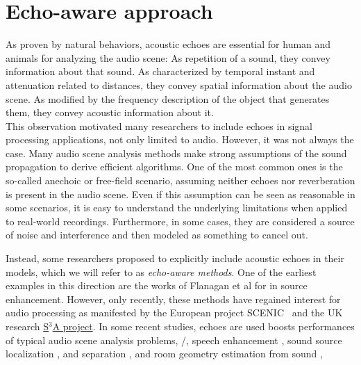 \section{Echo-aware approach}
As proven by natural behaviors, acoustic echoes are essential for human and animals for analyzing the audio scene:
As repetition of a sound, they convey information about that sound.
As characterized by temporal instant and attenuation related to distances, they convey spatial information about the audio scene.
As modified by the frequency description of the object that generates them, they convey acoustic information about it.
\\This observation motivated many researchers to include echoes in signal processing applications, not only limited to audio.
However, it was not always the case.
Many audio scene analysis methods make strong assumptions of the sound propagation to derive efficient algorithms.
One of the most common ones is the so-called anechoic or free-field scenario, assuming neither echoes nor reverberation is present in the audio scene.
Even if this assumption can be seen as reasonable in some scenarios, it is easy to understand the underlying limitations when applied to real-world recordings.
Furthermore, in some cases, they are considered a source of noise and interference and then modeled as something to cancel out.

\mynewline
Instead, some researchers proposed to explicitly include acoustic echoes in their models, which we will refer to as \textit{echo-aware methods}.
One of the earliest examples in this direction are the works of Flanagan et al for in source enhancement.
However, only recently, these methods have regained interest for audio processing as manifested by the European project SCENIC~ and the UK research \href{http://www.s3a-spatialaudio.org/}{S$^3$A project}.
In some recent studies, echoes are used boosts performances of typical audio scene analysis problems, \eg/, speech enhancement , sound source localization , and separation , and room geometry estimation from sound ,

